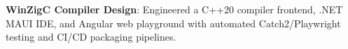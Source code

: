 \noindent
\textbf{WinZigC Compiler Design}: Engineered a C++20 compiler frontend, .NET MAUI IDE, and Angular web playground with automated Catch2/Playwright testing and CI/CD packaging pipelines. \hfill \href{https://github.com/UchihaIthachi/WinZigC-Parser}{\faGithub}